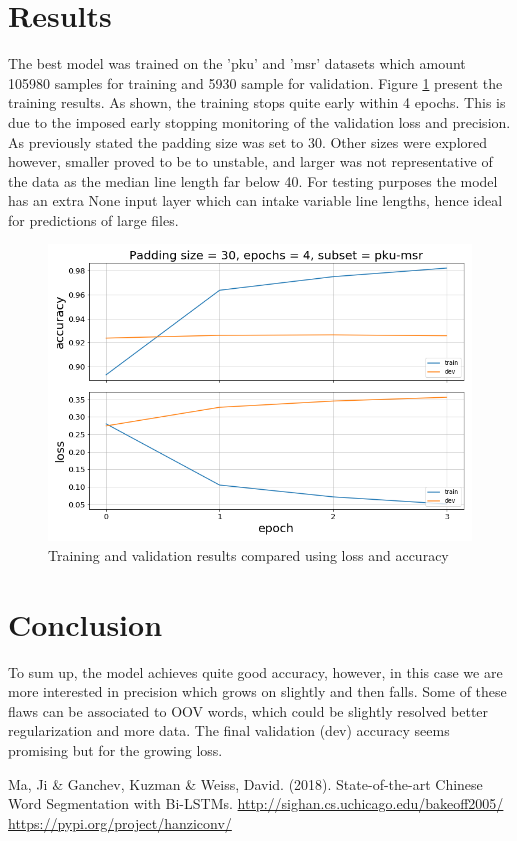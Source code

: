 \documentclass[12pt,a4paper]{article}
\begin{document}
\section{Results}
The best model was trained on the 'pku' and 'msr' datasets which amount 105980 samples for training and 5930 sample for validation.  Figure \ref{img:results} present the training results. As shown, the training stops quite early within 4 epochs. This is due to the imposed early stopping monitoring of the validation loss and precision.
As previously stated the padding size was set to 30. Other sizes were explored however, smaller proved to be to unstable, and larger was not representative of the data as the median line length far below 40.  For testing purposes the model has an extra None input layer which can intake variable line lengths, hence ideal for predictions of large files.
\begin{figure}[H]
\begin{center}
\includegraphics[width=0.7\columnwidth, angle = 0]{img/pku-msr.png}
\end{center}
\caption{Training and validation results compared using loss and accuracy}
\label{img:results}
\end{figure}
\section{Conclusion}


To sum up, the model achieves quite good accuracy, however, in this case we are more interested in precision which grows on slightly and then falls. Some of these flaws can be associated to OOV words, which could be slightly resolved better regularization and more data. The final validation (dev) accuracy seems promising but for the growing loss. 


\begin{thebibliography}{1}

 Ma, Ji \& Ganchev, Kuzman \& Weiss, David. (2018). State-of-the-art Chinese Word Segmentation with Bi-LSTMs. 
 \url{http://sighan.cs.uchicago.edu/bakeoff2005/}
 \url{https://pypi.org/project/hanziconv/}

\end{thebibliography}
\end{document}
